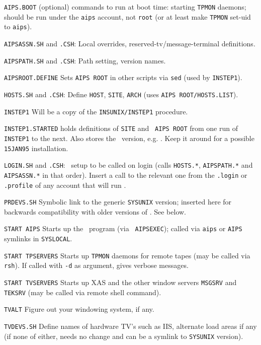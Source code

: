 {\parindent=3.7cm
\item{\tt AIPS.BOOT\quad} (optional) commands to run at boot time:
                starting {\tt TPMON} daemons; should be run under the
                {\tt aips} account, not {\tt root} (or at least make
                {\tt TPMON} set-uid to {\tt aips}).
\item{\tt AIPSASSN.SH\quad} and {\tt .CSH}: Local overrides,
                reserved-tv/message-terminal definitions.
\item{\tt AIPSPATH.SH\quad} and {\tt .CSH}: Path setting, version names.
\item{\tt AIPSROOT.DEFINE\quad} Sets {\tt AIPS ROOT} in other scripts
                via {\tt sed} (used by {\tt INSTEP1}).
\item{\tt HOSTS.SH\quad} and {\tt .CSH}: Define {\tt HOST}, {\tt SITE},
                {\tt ARCH} (uses {\tt \dol AIPS ROOT/HOSTS.LIST}).
\item{\tt INSTEP1\quad} Will be a copy of the {\tt\dol INSUNIX/INSTEP1}
                procedure.
\item{\tt INSTEP1.STARTED\quad} holds definitions of {\tt SITE} and {\tt
                AIPS ROOT} from one run of {\tt INSTEP1} to the next.
                Also stores the \AIPS\ version, e.g. \thisver.  Keep it
                around for a possible {\tt 15JAN95} installation. %
\item{\tt LOGIN.SH\quad} and {\tt .CSH}:  \AIPS\ setup to be called on
                login (calls {\tt HOSTS.*}, {\tt AIPSPATH.*} and {\tt
                AIPSASSN.*} in that order).  Insert a call to the relevant
                one from the {\tt .login} or {\tt .profile} of any account
                that will run \AIPS.
\item{\tt PRDEVS.SH\quad} Symbolic link to the generic {\tt\dol SYSUNIX}
                version; inserted here for backwards compatibility with
                older versions of \AIPS.  See below.
\item{\tt START AIPS\quad}  Starts up the \AIPS\ program (via {\tt
                AIPSEXEC}); called via {\tt aips} or {\tt AIPS} symlinks
                in {\tt\dol SYSLOCAL}.
\item{\tt START TPSERVERS\quad}  Starts up {\tt TPMON} daemons for
                remote tapes (may be called via {\tt rsh}).  If called
                with {\tt -d} as argument, gives verbose messages.
\item{\tt START TVSERVERS\quad}  Starts up XAS and the other window
                servers {\tt MSGSRV} and {\tt TEKSRV} (may be called via
                remote shell command).
\item{\tt TVALT\quad}  Figure out your windowing system, if any.
\item{\tt TVDEVS.SH\quad}  Define names of hardware TV's such as IIS,
                alternate load areas if any (if none of either, needs no
                change and can be a symlink to {\tt\dol SYSUNIX} version).
}

